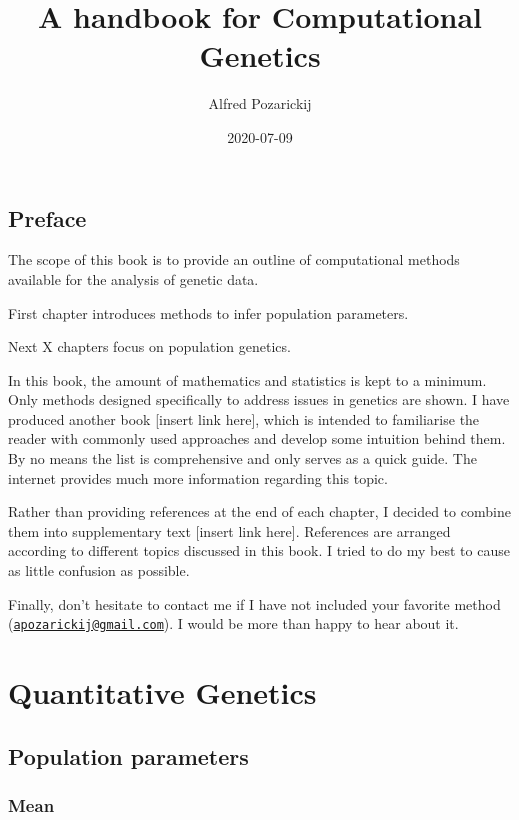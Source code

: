 \documentclass[
]{book}
\title{A handbook for Computational Genetics}
\author{Alfred Pozarickij}
\date{2020-07-09}
\begin{document}
\maketitle

{
\setcounter{tocdepth}{1}
\tableofcontents
}
\hypertarget{preface}{%
\chapter*{Preface}\label{preface}}

The scope of this book is to provide an outline of computational methods available for the analysis of genetic data.

First chapter introduces methods to infer population parameters.

Next X chapters focus on population genetics.

In this book, the amount of mathematics and statistics is kept to a minimum. Only methods designed specifically to address issues in genetics are shown. I have produced another book {[}insert link here{]}, which is intended to familiarise the reader with commonly used approaches and develop some intuition behind them. By no means the list is comprehensive and only serves as a quick guide. The internet provides much more information regarding this topic.

Rather than providing references at the end of each chapter, I decided to combine them into supplementary text {[}insert link here{]}. References are arranged according to different topics discussed in this book. I tried to do my best to cause as little confusion as possible.

Finally, don't hesitate to contact me if I have not included your favorite method (\href{mailto:apozarickij@gmail.com}{\nolinkurl{apozarickij@gmail.com}}). I would be more than happy to hear about it.

\hypertarget{part-quantitative-genetics}{%
\part{Quantitative Genetics}\label{part-quantitative-genetics}}

\hypertarget{population-parameters}{%
\chapter{Population parameters}\label{population-parameters}}

\hypertarget{mean}{%
\section{Mean}\label{mean}}
\end{document}
